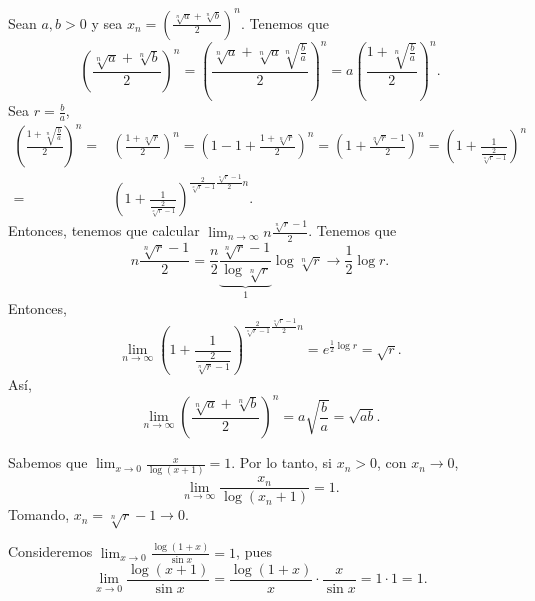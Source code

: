 \begin{eg}
	\normalfont Sean $\displaystyle a,b > 0 $ y sea $\displaystyle x_{n} = \left(\frac{\sqrt[n]{a} + \sqrt[n]{b}}{2}\right)^{n} $. Tenemos que
	\[ \left(\frac{\sqrt[n]{a} + \sqrt[n]{b}}{2}\right)^{n} = \left(\frac{\sqrt[n]{a} + \sqrt[n]{a}\sqrt[n]{\frac{b}{a}}}{2}\right)^{n} = a \left(\frac{1 + \sqrt[n]{\frac{b}{a}}}{2}\right)^{n} .\]
Sea $\displaystyle r = \frac{b}{a} $,
\[
\begin{split}
	 \left(\frac{1 + \sqrt[n]{\frac{b}{a}}}{2}\right)^{n} = &  \left(\frac{1 + \sqrt[n]{r}}{2}\right)^{n} = \left(1-1+\frac{1+\sqrt[n]{r}}{2}\right)^{n}= \left(1 + \frac{\sqrt[n]{r}-1}{2}\right)^{n} = \left(1 + \frac{1}{\frac{2}{\sqrt[n]{r}-1}}\right)^{n} \\
	= & \left(1+\frac{1}{\frac{2}{\sqrt[n]{r}-1}}\right)^{\frac{2}{\sqrt[n]{r}-1}\frac{\sqrt[n]{r}-1}{2}n}.
\end{split}
\]
Entonces, tenemos que calcular $\displaystyle \lim_{n \to \infty}n\frac{\sqrt[n]{r}-1}{2} $. Tenemos que
\[ n \frac{\sqrt[n]{r}-1}{2} = \frac{n}{2}\underbrace{\frac{\sqrt[n]{r}-1}{\log\sqrt[n]{r}}}_{1}\log\sqrt[n]{r} \to \frac{1}{2}\log r.\]
Entonces, 
\[\lim_{n \to \infty}\left(1+\frac{1}{\frac{2}{\sqrt[n]{r}-1}}\right)^{\frac{2}{\sqrt[n]{r}-1}\frac{\sqrt[n]{r}-1}{2}n}=e^{\frac{1}{2}\log r} = \sqrt{r} .\]
Así, 
\[\lim_{n \to \infty}\left(\frac{\sqrt[n]{a} + \sqrt[n]{b}}{2}\right)^{n} = a \sqrt{\frac{b}{a}} = \sqrt{ab} .\]
\end{eg}

\begin{observation}
\normalfont Sabemos que $\displaystyle \lim_{x \to 0}\frac{x}{\log\left(x+1\right)} = 1 $. Por lo tanto, si $\displaystyle x_{n} > 0 $, con $\displaystyle x_{n} \to 0 $, 
\[\lim_{n \to \infty}\frac{x_{n}}{\log\left(x_{n}+1\right)} = 1.\]
Tomando, $\displaystyle x_{n} = \sqrt[n]{r} - 1 \to 0 $.
\end{observation}

\begin{eg}
\normalfont Consideremos $\displaystyle \lim_{x \to 0} \frac{\log\left(1+x\right)}{\sin x} = 1 $, pues
\[\lim_{x \to 0}\frac{\log\left(x+1\right)}{\sin x} = \frac{\log\left(1+x\right)}{x} \cdot \frac{x}{\sin x} = 1 \cdot 1 = 1 .\]
\end{eg}
